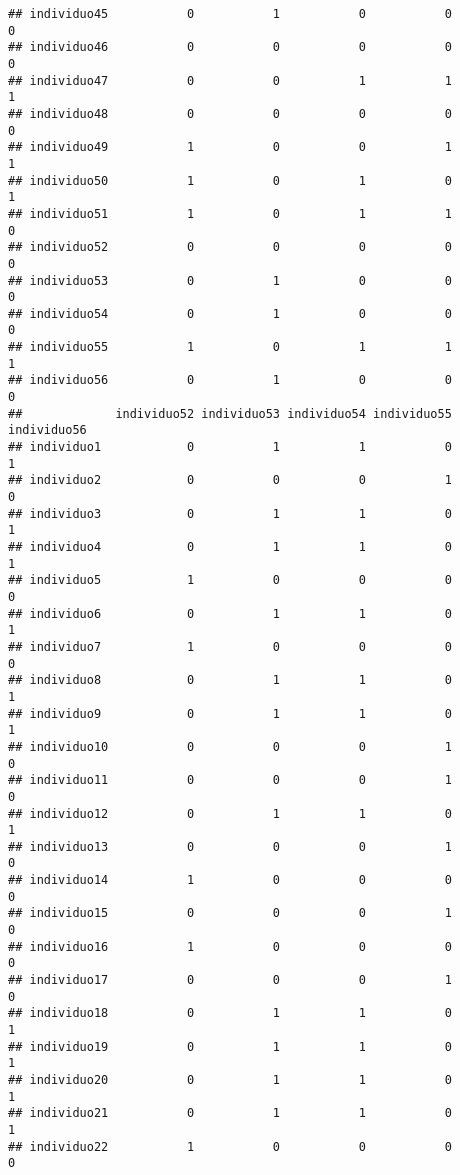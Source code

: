 \documentclass[
]{article}
\begin{document}
\begin{verbatim}
## individuo45           0           1           0           0           0
## individuo46           0           0           0           0           0
## individuo47           0           0           1           1           1
## individuo48           0           0           0           0           0
## individuo49           1           0           0           1           1
## individuo50           1           0           1           0           1
## individuo51           1           0           1           1           0
## individuo52           0           0           0           0           0
## individuo53           0           1           0           0           0
## individuo54           0           1           0           0           0
## individuo55           1           0           1           1           1
## individuo56           0           1           0           0           0
##             individuo52 individuo53 individuo54 individuo55 individuo56
## individuo1            0           1           1           0           1
## individuo2            0           0           0           1           0
## individuo3            0           1           1           0           1
## individuo4            0           1           1           0           1
## individuo5            1           0           0           0           0
## individuo6            0           1           1           0           1
## individuo7            1           0           0           0           0
## individuo8            0           1           1           0           1
## individuo9            0           1           1           0           1
## individuo10           0           0           0           1           0
## individuo11           0           0           0           1           0
## individuo12           0           1           1           0           1
## individuo13           0           0           0           1           0
## individuo14           1           0           0           0           0
## individuo15           0           0           0           1           0
## individuo16           1           0           0           0           0
## individuo17           0           0           0           1           0
## individuo18           0           1           1           0           1
## individuo19           0           1           1           0           1
## individuo20           0           1           1           0           1
## individuo21           0           1           1           0           1
## individuo22           1           0           0           0           0

\end{verbatim}
\end{document}
